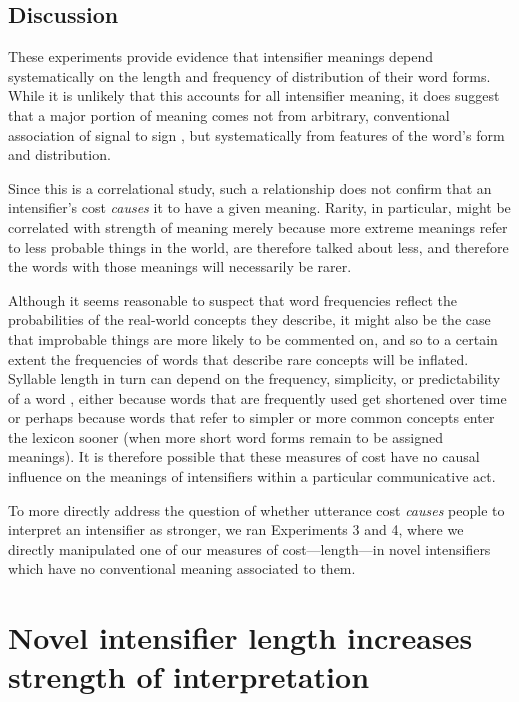 \documentclass[10pt,letterpaper]{article}
\newcommand{\todo}[1]{{\color{red}#1}}
\begin{document}
\subsection{Discussion}  
\todo{  
These experiments provide evidence that intensifier meanings depend systematically on the length and frequency of distribution of their word forms.
While it is unlikely that this accounts for all intensifier meaning, it does suggest that a major portion of meaning comes not from arbitrary, conventional association of signal to sign \cite{de_saussure_nature_1916}, but systematically from features of the word's form and distribution.

Since this is a correlational study, such a relationship does not confirm that an intensifier's cost \emph{causes} it to have a given meaning.
Rarity, in particular, might be correlated with strength of meaning merely because more extreme meanings refer to less probable things in the world, are therefore talked about less, and therefore the words with those meanings will necessarily be rarer.

Although it seems reasonable to suspect that word frequencies reflect the probabilities of the real-world concepts they describe, it might also be the case that improbable things are more likely to be commented on, and so to a certain extent the frequencies of words that describe rare concepts will be inflated. Syllable length in turn can depend on the frequency, simplicity, or predictability of a word \cite{zipf_psycho-biology_1935, lewis_conceptual_2016, mahowald_info/information_2013}, either because words that are frequently used get shortened over time \cite{kanwal_evolution_2016} or perhaps because words that refer to simpler or more common concepts enter the lexicon sooner (when more short word forms remain to be assigned meanings). It is therefore possible that these measures of cost have no causal influence on the meanings of intensifiers within a particular communicative act.

To more directly address the question of whether utterance cost \emph{causes} people to interpret an intensifier as stronger, we ran Experiments 3 and 4, where we directly manipulated one of our measures of cost---length---in novel intensifiers which have no conventional meaning associated to them.
}

\section{Novel intensifier length increases strength of interpretation}
\end{document}
